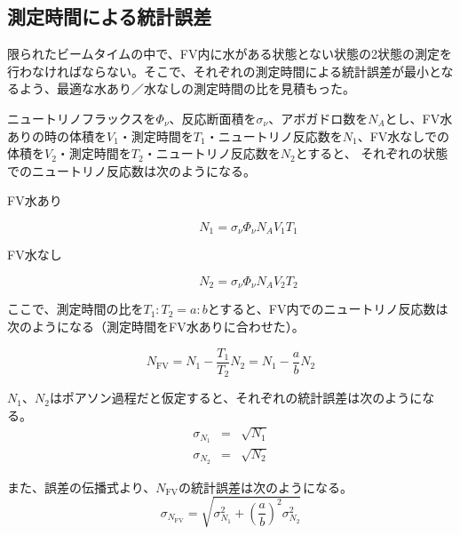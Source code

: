 \documentclass[11pt]{ltjsreport}
\newcommand{\fv}{\mathrm{FV}}
\begin{document}
\subsection{測定時間による統計誤差}
限られたビームタイムの中で、FV内に水がある状態とない状態の2状態の測定を行わなければならない。そこで、それぞれの測定時間による統計誤差が最小となるよう、最適な水あり／水なしの測定時間の比を見積もった。

ニュートリノフラックスを$\Phi_{\nu}$、反応断面積を$\sigma_{\nu}$、アボガドロ数を$N_{A}$とし、FV水ありの時の体積を$V_{1}$・測定時間を$T_{1}$・ニュートリノ反応数を$N_{1}$、FV水なしでの体積を$V_{2}$・測定時間を$T_{2}$・ニュートリノ反応数を$N_{2}$とすると、
それぞれの状態でのニュートリノ反応数は次のようになる。

\begin{description}
\item [FV水あり]%
\begin{equation}
N_{1} = \sigma_{\nu}\Phi_{\nu}N_{A}V_{1}T_{1}
\label{Nww}
\end{equation}
%
\item [FV水なし]
\begin{equation}
N_{2} = \sigma_{\nu}\Phi_{\nu}N_{A}V_{2}T_{2}
\label{Nwow}
\end{equation}
\end{description}

ここで、測定時間の比を$T_{1}:T_{2}=a:b$とすると、FV内でのニュートリノ反応数は次のようになる（測定時間をFV水ありに合わせた）。

\begin{equation}
N_{\fv} = N_{1}-\frac{T_{1}}{T_{2}}N_{2} = N_{1}-\frac{a}{b}N_{2}
\label{Nfv}
\end{equation}

$N_{1}$、$N_{2}$はポアソン過程だと仮定すると、それぞれの統計誤差は次のようになる。
\begin{eqnarray}
\sigma_{N_{1}} & = & \sqrt{N_{1}} \label{sigma1}\\
\sigma_{N_{2}} & = & \sqrt{N_{2}} \label{sigma2}
\end{eqnarray}

また、誤差の伝播式より、$N_{\fv}$の統計誤差は次のようになる。
\begin{equation}
\sigma_{N_{\fv}} = \sqrt{\sigma_{N_{1}}^{2}+\left(\frac{a}{b}\right)^{2}\sigma_{N_{2}}^{2}} \label{sigmafv}
\end{equation}
\end{document}
